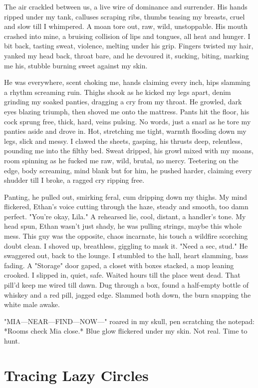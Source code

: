 \documentclass{article}
\begin{document}
The air crackled between us, a live wire of dominance and surrender. His hands ripped under my tank, calluses scraping ribs, thumbs teasing my breasts, cruel and slow till I whimpered. A moan tore out, raw, wild, unstoppable. His mouth crashed into mine, a bruising collision of lips and tongues, all heat and hunger. I bit back, tasting sweat, violence, melting under his grip. Fingers twisted my hair, yanked my head back, throat bare, and he devoured it, sucking, biting, marking me his, stubble burning sweet against my skin.

He was everywhere, scent choking me, hands claiming every inch, hips slamming a rhythm screaming ruin. Thighs shook as he kicked my legs apart, denim grinding my soaked panties, dragging a cry from my throat. He growled, dark eyes blazing triumph, then shoved me onto the mattress. Pants hit the floor, his cock sprung free, thick, hard, veins pulsing. No words, just a snarl as he tore my panties aside and drove in. Hot, stretching me tight, warmth flooding down my legs, slick and messy. I clawed the sheets, gasping, his thrusts deep, relentless, pounding me into the filthy bed. Sweat dripped, his growl mixed with my moans, room spinning as he fucked me raw, wild, brutal, no mercy. Teetering on the edge, body screaming, mind blank but for him, he pushed harder, claiming every shudder till I broke, a ragged cry ripping free.

Panting, he pulled out, smirking feral, cum dripping down my thighs. My mind flickered, Ethan's voice cutting through the haze, steady and smooth, too damn perfect. "You're okay, Lila." A rehearsed lie, cool, distant, a handler's tone. My head spun, Ethan wasn't just shady, he was pulling strings, maybe this whole mess. This guy was the opposite, chaos incarnate, his touch a wildfire scorching doubt clean. I shoved up, breathless, giggling to mask it. "Need a sec, stud." He swaggered out, back to the lounge. I stumbled to the hall, heart slamming, bass fading. A "Storage" door gaped, a closet with boxes stacked, a mop leaning crooked. I slipped in, quiet, safe. Waited hours till the place went dead. That pill'd keep me wired till dawn. Dug through a box, found a half-empty bottle of whiskey and a red pill, jagged edge. Slammed both down, the burn snapping the white male awake.

"MIA—NEAR—FIND—NOW—" roared in my skull, pen scratching the notepad: *Rooms check Mia close.* Blue glow flickered under my skin. Not real. Time to hunt.

\section{Tracing Lazy Circles}
\end{document}
